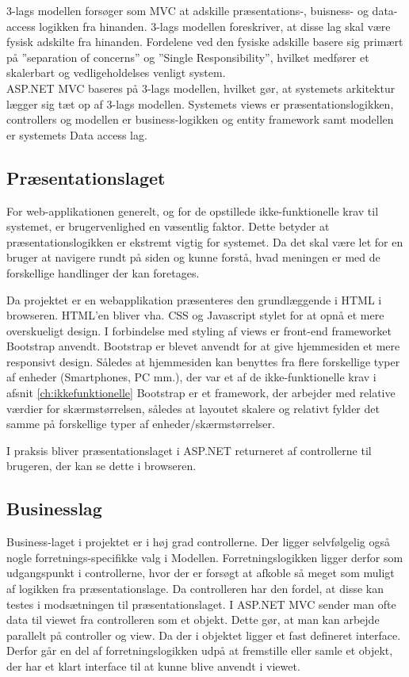 3-lags modellen forsøger som MVC at adskille præsentations-, buisness- og data-access logikken fra hinanden. 3-lags modellen foreskriver, at disse lag skal være fysisk adskilte fra hinanden. Fordelene ved den fysiske adskille basere sig primært på ''separation of concerns'' og ''Single Responsibility'', hvilket medfører et skalerbart og vedligeholdelses venligt system.\\
ASP.NET MVC baseres på 3-lags modellen, hvilket gør, at systemets arkitektur lægger sig tæt op af 3-lags modellen.
Systemets views er præsentationslogikken, controllers og modellen er business-logikken og entity framework samt modellen er systemets Data access lag. 

\subsection{Præsentationslaget}
For web-applikationen generelt, og for de opstillede ikke-funktionelle krav til systemet, er brugervenlighed en væsentlig faktor. Dette betyder at præsentationslogikken er ekstremt vigtig for systemet. Da det skal være let for en bruger at navigere rundt på siden og kunne forstå, hvad meningen er med de forskellige handlinger der kan foretages.

Da projektet er en webapplikation præsenteres den grundlæggende i HTML\cite{HTML} i browseren. HTML'en bliver vha. CSS\cite{CSS} og Javascript\cite{JavaScript} stylet for at opnå et mere overskueligt design. I forbindelse med styling af views er front-end frameworket Bootstrap\cite{Bootstrap} anvendt. Bootstrap er blevet anvendt for at give hjemmesiden et mere responsivt design. Således at hjemmesiden kan benyttes fra flere forskellige typer af enheder (Smartphones, PC mm.), der var et af de ikke-funktionelle krav i afsnit \ref{ch:ikkefunktionelle}
Bootstrap er et framework, der arbejder med relative værdier for skærmstørrelsen, således at layoutet skalere og relativt fylder det samme på forskellige typer af enheder/skærmstørrelser.

I  praksis bliver  præsentationslaget i ASP.NET returneret af controllerne til brugeren, der kan se dette i browseren.%

\subsection{Businesslag}
Business-laget i projektet er i høj grad controllerne. Der ligger selvfølgelig også nogle forretnings-specifikke valg i Modellen. Forretningslogikken ligger derfor som udgangspunkt i controllerne, hvor der er forsøgt at afkoble så meget som muligt af logikken fra præsentationslage. Da controlleren har den fordel, at disse kan testes i modsætningen til præsentationslaget. I ASP.NET MVC sender man ofte data til viewet fra controlleren som et objekt. Dette gør, at man kan arbejde parallelt på controller og view. Da der i objektet ligger et fast defineret interface. Derfor går en del af forretningslogikken udpå at fremstille eller samle et objekt, der har et klart interface til at kunne blive anvendt i viewet. 

